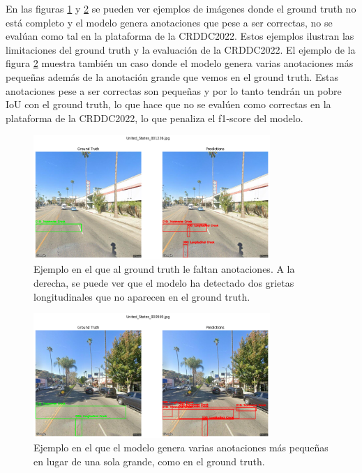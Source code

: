 En las figuras \ref{fig:ground_truth_example_1} y \ref{fig:ground_truth_example_4} se pueden ver ejemplos de imágenes donde el ground truth no está completo y el modelo genera anotaciones que pese a ser correctas, no se evalúan como tal en la plataforma de la CRDDC2022. Estos ejemplos ilustran las limitaciones del ground truth y la evaluación de la CRDDC2022. El ejemplo de la figura \ref{fig:ground_truth_example_4} muestra también un caso donde el modelo genera varias anotaciones más pequeñas además de la anotación grande que vemos en el ground truth. Estas anotaciones pese a ser correctas son pequeñas y por lo tanto tendrán un pobre IoU con el ground truth, lo que hace que no se evalúen como correctas en la plataforma de la CRDDC2022, lo que penaliza el f1-score del modelo.

\begin{figure}[H]
    \centering
    \includegraphics[width=0.8\textwidth]{img/ground_truth_example_1.png}
    \caption{Ejemplo en el que al ground truth le faltan anotaciones. A la derecha, se puede ver que el modelo ha detectado dos grietas longitudinales que no aparecen en el ground truth.}
    \label{fig:ground_truth_example_1}
\end{figure}

\begin{figure}[H]
    \centering
    \includegraphics[width=0.8\textwidth]{img/ground_truth_example_4.png}
    \caption{Ejemplo en el que el modelo genera varias anotaciones más pequeñas en lugar de una sola grande, como en el ground truth.}
    \label{fig:ground_truth_example_4}
\end{figure}

